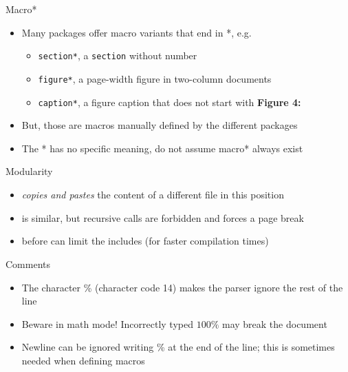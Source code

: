 \documentclass[english]{beamer}
\let\olditem\item
\renewcommand{\item}{\setlength{\itemsep}{\fill}\olditem}
\newenvironment{sitemize}{\let\item\olditem \begin{itemize}}{\vfill\end{itemize}}
\let\textttt\texttt
\renewcommand{\texttt}[1]{\colorbox{gray!10}{\textttt{#1}}}
\begin{document}
\begin{frame}{Macro*}
    \begin{itemize}
        \item Many packages offer macro variants that end in *, e.g. 
        \begin{sitemize}
            \item \texttt{section*}, a \texttt{section} without number
            \item \texttt{figure*}, a page-width figure in two-column documents
            \item \texttt{caption*}, a figure caption that does not start with \textbf{Figure 4:}
        \end{sitemize}
        \item But, those are macros manually defined by the different packages
        \item The * has no specific meaning, do not assume macro* always exist
    \end{itemize}
\end{frame}

\begin{frame}[fragile]{Modularity}
    \begin{itemize}
        \item \verb|| \textit{copies and pastes} the content of a different file in this position
        \item \verb|| is similar, but recursive calls are forbidden and forces a page break
        \item \verb|| before \verb|| can limit the includes (for faster compilation times)
    \end{itemize}
\end{frame}

\begin{frame}{Comments}
    \begin{itemize}
        \item The character \% (character code 14) makes the parser ignore the rest of the line
        \item Beware in math mode! Incorrectly typed $100\%$ may break the document
        \item Newline can be ignored writing \% at the end of the line; this is sometimes needed when defining macros 
    \end{itemize}
\end{frame}
\end{document}
